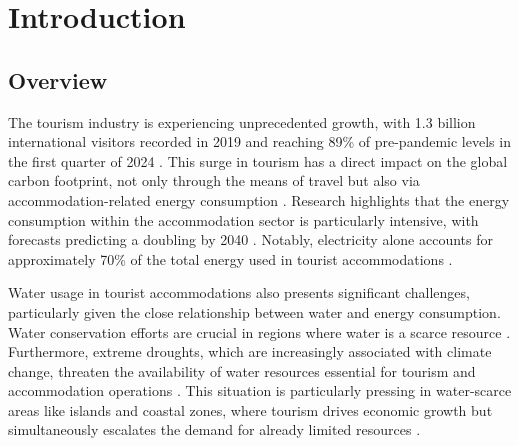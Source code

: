 

\chapter{Introduction}





\section{Overview}

The tourism industry is experiencing unprecedented growth, with 1.3 billion international visitors recorded in 2019 and 
reaching 89\% of pre-pandemic levels in the first quarter of 2024 \cite{UNWTO2024a, UNWTO2024b}. This surge in tourism 
has a direct impact on the global carbon footprint, not only through the means of travel but also via 
accommodation-related energy consumption \cite{Becken2001, Scott2008}. Research highlights that the energy consumption 
within the accommodation sector is particularly intensive, with forecasts predicting a doubling by 2040 
\cite{Jos2016, Gossling2015}. Notably, electricity alone accounts for approximately 70\% of the total energy used in 
tourist accommodations \cite{Becken2001, Warren2017}.

Water usage in tourist accommodations also presents significant challenges, particularly given the close relationship 
between water and energy consumption. Water conservation efforts are crucial in regions where water is a scarce resource 
\cite{Becken2017, Lam2016}. Furthermore, extreme droughts, which are increasingly associated with climate change, 
threaten the availability of water resources essential for tourism and accommodation operations \cite{Ziervogel2010}. 
This situation is particularly pressing in water-scarce areas like islands and coastal zones, where tourism drives 
economic growth but simultaneously escalates the demand for already limited resources \cite{Gossling2015}.

